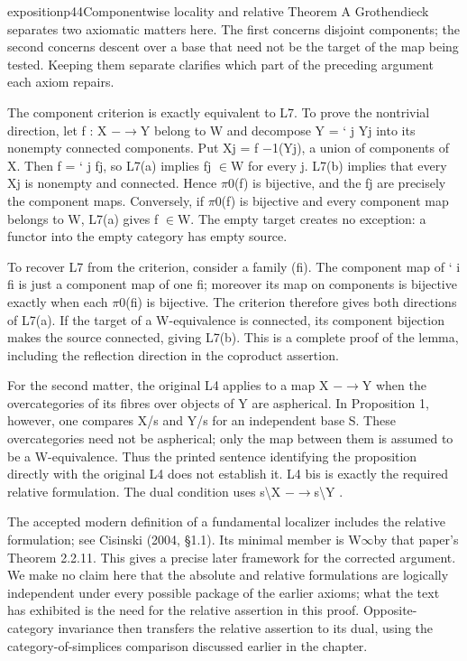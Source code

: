 \begin{dcomment}{exposition}{p44}{Componentwise locality and relative Theorem A}
Grothendieck separates two axiomatic matters here. The first concerns disjoint components; the second concerns descent over a base that need not be the target of the map being tested. Keeping them separate clarifies which part of the preceding argument each axiom repairs.

The component criterion is exactly equivalent to L7. To prove the nontrivial direction, let f : X \ensuremath{-}\ensuremath{\to}Y belong to W and decompose Y = ` j Yj into its nonempty connected components. Put Xj = f \ensuremath{-}1(Yj), a union of components of X. Then f = ` j fj, so L7(a) implies fj \ensuremath{\in}W for every j. L7(b) implies that every Xj is nonempty and connected. Hence \ensuremath{\pi}0(f) is bijective, and the fj are precisely the component maps. Conversely, if \ensuremath{\pi}0(f) is bijective and every component map belongs to W, L7(a) gives f \ensuremath{\in}W. The empty target creates no exception: a functor into the empty category has empty source.

To recover L7 from the criterion, consider a family (fi). The component map of ` i fi is just a component map of one fi; moreover its map on components is bijective exactly when each \ensuremath{\pi}0(fi) is bijective. The criterion therefore gives both directions of L7(a). If the target of a W-equivalence is connected, its component bijection makes the source connected, giving L7(b). This is a complete proof of the lemma, including the reflection direction in the coproduct assertion.

For the second matter, the original L4 applies to a map X \ensuremath{-}\ensuremath{\to}Y when the overcategories of its fibres over objects of Y are aspherical. In Proposition 1, however, one compares X/s and Y/s for an independent base S. These overcategories need not be aspherical; only the map between them is assumed to be a W-equivalence. Thus the printed sentence identifying the proposition directly with the original L4 does not establish it. L4 bis is exactly the required relative formulation. The dual condition uses s\textbackslash{}X \ensuremath{-}\ensuremath{\to}s\textbackslash{}Y .

The accepted modern definition of a fundamental localizer includes the relative formulation; see Cisinski (2004, \S{}1.1). Its minimal member is W\ensuremath{\infty}by that paper’s Theorem 2.2.11. This gives a precise later framework for the corrected argument. We make no claim here that the absolute and relative formulations are logically independent under every possible package of the earlier axioms; what the text has exhibited is the need for the relative assertion in this proof. Opposite-category invariance then transfers the relative assertion to its dual, using the category-of-simplices comparison discussed earlier in the chapter.

\end{dcomment}

